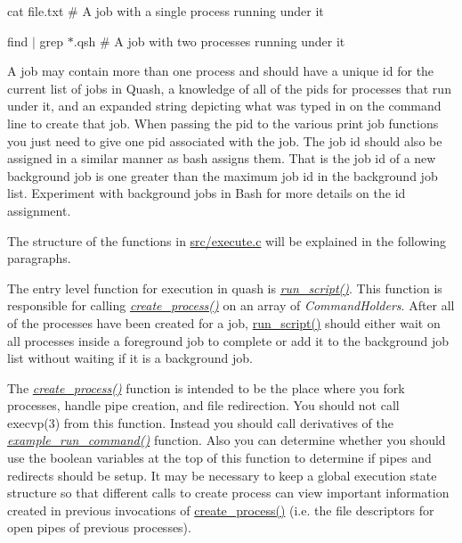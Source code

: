 cat file.\+txt \# A job with a single process running under it

find $\vert$ grep $\ast$.qsh \# A job with two processes running under it

A job may contain more than one process and should have a unique id for the current list of jobs in Quash, a knowledge of all of the pids for processes that run under it, and an expanded string depicting what was typed in on the command line to create that job. When passing the pid to the various print job functions you just need to give one pid associated with the job. The job id should also be assigned in a similar manner as bash assigns them. That is the job id of a new background job is one greater than the maximum job id in the background job list. Experiment with background jobs in Bash for more details on the id assignment.

The structure of the functions in \hyperlink{execute_8c}{src/execute.\+c} will be explained in the following paragraphs.

The entry level function for execution in quash is {\itshape \hyperlink{execute_8c_a4dab67459028f3b5a60d1a3695933f4b}{run\+\_\+script()}}. This function is responsible for calling {\itshape \hyperlink{execute_8c_acffe0d67f5dfe68ccf3765cf8ae29dab}{create\+\_\+process()}} on an array of {\itshape Command\+Holders}. After all of the processes have been created for a job, \hyperlink{execute_8c_a4dab67459028f3b5a60d1a3695933f4b}{run\+\_\+script()} should either wait on all processes inside a foreground job to complete or add it to the background job list without waiting if it is a background job.

The {\itshape \hyperlink{execute_8c_acffe0d67f5dfe68ccf3765cf8ae29dab}{create\+\_\+process()}} function is intended to be the place where you fork processes, handle pipe creation, and file redirection. You should not call execvp(3) from this function. Instead you should call derivatives of the {\itshape \hyperlink{execute_8c_a75b252ab1292f5947f2bcd0454f6378b}{example\+\_\+run\+\_\+command()}} function. Also you can determine whether you should use the boolean variables at the top of this function to determine if pipes and redirects should be setup. It may be necessary to keep a global execution state structure so that different calls to create process can view important information created in previous invocations of \hyperlink{execute_8c_acffe0d67f5dfe68ccf3765cf8ae29dab}{create\+\_\+process()} (i.\+e. the file descriptors for open pipes of previous processes).

